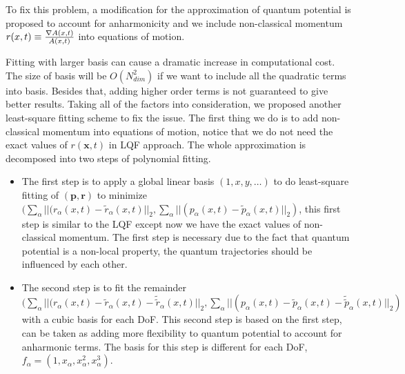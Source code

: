 \documentclass[11pt,letter,nocenter]{revtex4-1}
\begin{document}
To fix this problem, a modification for the approximation of quantum potential is proposed to account for anharmonicity and we include non-classical momentum $r(x,t) \equiv \frac{\nabla A(x,t)}{A(x,t)}$ into equations of motion.  

Fitting with larger basis can cause a dramatic  increase in computational cost. The size of basis will be $O(N_{dim}^2)$
if we want to include all the quadratic terms into basis. Besides that, adding higher order terms is not guaranteed to give better results.  Taking all of the factors into consideration,  we proposed another least-square fitting scheme to fix the issue. The first thing we do is to add non-classical momentum into equations of motion, notice that we do not need the exact values of $r(\bm x,t)$ in LQF approach. The whole approximation is decomposed into two steps of polynomial fitting. 
 \begin{itemize}
 \item The first step is to apply a global linear basis $(1,x,y,\dots)$ to do least-square fitting of $(\bm p, \bm r)$ to minimize $(\sum_\alpha || (r_\alpha(x,t) - \tilde{r}_\alpha(x,t) ||_2, \sum_\alpha || (p_\alpha(x,t) - \tilde{p}_\alpha(x,t) ||_2)$,  this first step is similar to the LQF except now we have the exact values of non-classical momentum. The first step is necessary due to the fact that quantum potential is a non-local property, the quantum trajectories should be influenced by each other. 
 \item The second step is to fit the remainder $(\sum_\alpha || (r_\alpha(x,t) - \tilde{r}_\alpha(x,t) - \tilde{\tilde{r}}_\alpha(x,t)  ||_2, \sum_\alpha || (p_\alpha(x,t) - \tilde{p}_\alpha(x,t) - \tilde{\tilde{p}}_\alpha(x,t) ||_2)$ with a cubic basis for each DoF. 
This second step is based on the first step, can be taken as adding more flexibility to quantum potential to account for anharmonic terms. 
 The basis for this step is different for each DoF, $f_\alpha = (1,x_\alpha,x_\alpha^2,x_\alpha^3)$.  
 \end{itemize}
\end{document}
